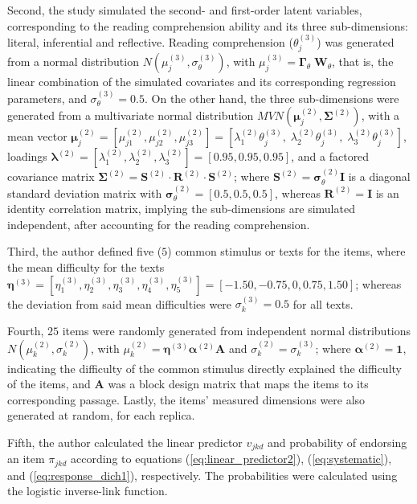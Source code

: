 Second, the study simulated the second- and first-order latent variables, corresponding to the reading comprehension ability and its three sub-dimensions: literal, inferential and reflective. Reading comprehension ($\theta^{(3)}_{j}$) was generated from a normal distribution $N( \mu^{(3)}_{j}, \sigma^{(3)}_{\theta} )$, with $\mu^{(3)}_{j} = \pmb{\Gamma}_{\theta} \; \mathbf{W}_{\theta}$, that is, the linear combination of the simulated covariates and its corresponding regression parameters, and $\sigma^{(3)}_{\theta}=0.5$. On the other hand, the three sub-dimensions were generated from a multivariate normal distribution $MVN( \pmb{\mu}^{(2)}_{j} , \pmb{\Sigma}^{(2)})$, with a mean vector $\pmb{\mu}^{(2)}_{j} = [\mu^{(2)}_{j1}, \mu^{(2)}_{j2}, \mu^{(2)}_{j3}] = [\lambda^{(2)}_{1} \theta^{(3)}_{j}, \; \lambda^{(2)}_{2} \theta^{(3)}_{j}, \; \lambda^{(2)}_{3} \theta^{(3)}_{j} ]$, loadings $\pmb{\lambda}^{(2)} = [\lambda^{(2)}_{1}, \lambda^{(2)}_{2}, \lambda^{(2)}_{3}] = [0.95, 0.95, 0.95]$, and a factored covariance matrix $\pmb{\Sigma}^{(2)} = \mathbf{S}^{(2)} \cdot \mathbf{R}^{(2)} \cdot \mathbf{S}^{(2)}$; where $\mathbf{S}^{(2)} = \pmb{\sigma}^{(2)}_{\theta} \mathbf{I}$ is a diagonal standard deviation matrix with $\pmb{\sigma}^{(2)}_{\theta} = [0.5, 0.5, 0.5]$, whereas $\mathbf{R}^{(2)} = \mathbf{I}$ is an identity correlation matrix, implying the sub-dimensions are simulated independent, after accounting for the reading comprehension.

Third, the author defined five ($5$) common stimulus or texts for the items, where the mean difficulty for the texts $\pmb{\eta}^{(3)} = [\eta^{(3)}_{1}, \eta^{(3)}_{2}, \eta^{(3)}_{3}, \eta^{(3)}_{4}, \eta^{(3)}_{5}] = [-1.50, -0.75, 0, 0.75, 1.50]$; whereas the deviation from said mean difficulties were $\sigma^{(3)}_{k} = 0.5$ for all texts. 

Fourth, $25$ items were randomly generated from independent normal distributions $N( \mu^{(2)}_{k}, \sigma^{(2)}_{k} ) $, with $\mu^{(2)}_{k} = \pmb{\eta}^{(3)} \pmb{\alpha}^{(2)} \mathbf{A}$ and $\sigma^{(2)}_{k} = \sigma^{(3)}_{k}$; where $\pmb{\alpha}^{(2)} = \mathbf{1}$, indicating the difficulty of the common stimulus directly explained the difficulty of the items, and $\mathbf{A}$ was a block design matrix that maps the items to its corresponding passage. Lastly, the items' measured dimensions were also generated at random, for each replica.

Fifth, the author calculated the linear predictor $v_{jkd}$ and probability of endorsing an item $\pi_{jkd}$ according to equations (\ref{eq:linear_predictor2}), (\ref{eq:systematic}), and (\ref{eq:response_dich1}), respectively. The probabilities were calculated using the logistic inverse-link function.
	
